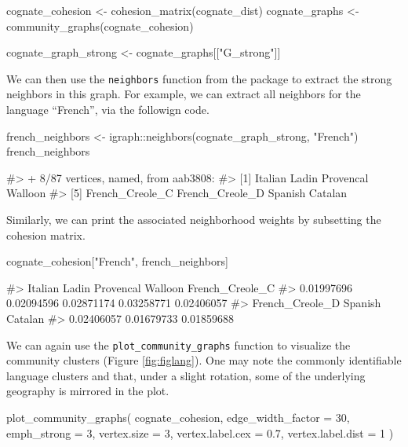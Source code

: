 \begin{Schunk}
\begin{Sinput}
cognate_cohesion <- cohesion_matrix(cognate_dist)
cognate_graphs <- community_graphs(cognate_cohesion)

cognate_graph_strong <- cognate_graphs[["G_strong"]]
\end{Sinput}
\end{Schunk}

We can then use the \texttt{neighbors} function from the
 package to extract the strong neighbors in this graph.
For example, we can extract all neighbors for the language ``French'',
via the followign code.

\begin{Schunk}
\begin{Sinput}
french_neighbors <- igraph::neighbors(cognate_graph_strong, "French")
french_neighbors
\end{Sinput}
\begin{Soutput}
#> + 8/87 vertices, named, from aab3808:
#> [1] Italian         Ladin           Provencal       Walloon        
#> [5] French_Creole_C French_Creole_D Spanish         Catalan
\end{Soutput}
\end{Schunk}

Similarly, we can print the associated neighborhood weights by
subsetting the cohesion matrix.

\begin{Schunk}
\begin{Sinput}
cognate_cohesion["French", french_neighbors]
\end{Sinput}
\begin{Soutput}
#>         Italian           Ladin       Provencal         Walloon French_Creole_C 
#>      0.01997696      0.02094596      0.02871174      0.03258771      0.02406057 
#> French_Creole_D         Spanish         Catalan 
#>      0.02406057      0.01679733      0.01859688
\end{Soutput}
\end{Schunk}

We can again use the \texttt{plot\_community\_graphs} function to
visualize the community clusters (Figure \ref{fig:figlang}). One may
note the commonly identifiable language clusters and that, under a
slight rotation, some of the underlying geography is mirrored in the
plot.

\begin{Schunk}
\begin{Sinput}
plot_community_graphs(
  cognate_cohesion,
  edge_width_factor = 30,
  emph_strong = 3,
  vertex.size = 3,
  vertex.label.cex = 0.7,
  vertex.label.dist = 1
)
\end{Sinput}
\end{Schunk}

